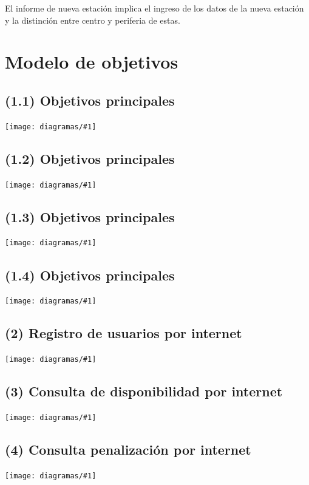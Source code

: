 \documentclass[a4paper, 10pt, twoside]{article}
\newcommand{\diagramav}[1]{
  \texttt{[image: diagramas/\#1]}
}
\newcommand{\diagramah}[1]{
  \texttt{[image: diagramas/\#1]}
}
\begin{document}
El informe de nueva estación implica el ingreso de los datos de la nueva estación y la distinción entre centro y periferia de estas.




\section{Modelo de objetivos}

\subsection{(1.1)  Objetivos principales}
\diagramav{objetivos-1.1}

\subsection{(1.2)  Objetivos principales}
\diagramah{objetivos-1.2}

\subsection{(1.3)  Objetivos principales}
\diagramav{objetivos-1.3}

\subsection{(1.4)  Objetivos principales}
\diagramah{objetivos-1.4}

\subsection{(2)    Registro de usuarios por internet}
\diagramav{objetivos-2}

\subsection{(3)    Consulta de disponibilidad por internet}
\diagramav{objetivos-3}

\subsection{(4)    Consulta penalización por internet}
\diagramav{objetivos-4}
\end{document}
